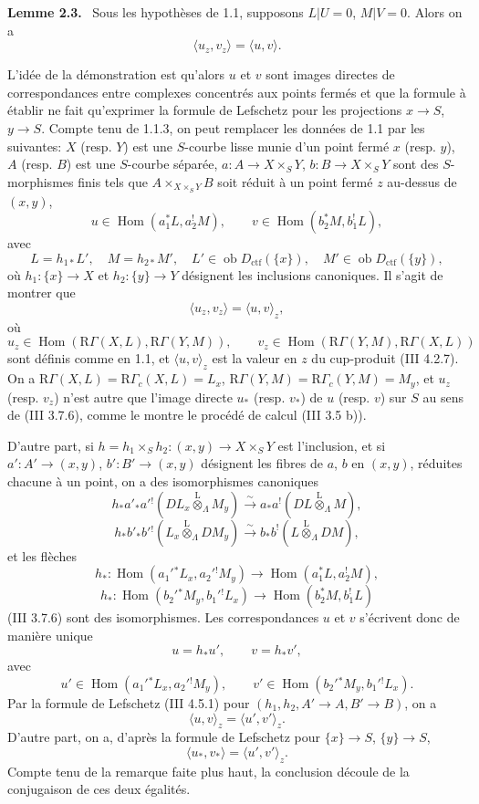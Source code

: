 \documentclass[11pt]{article}
\newenvironment{statement}[1]{\par\medskip\noindent\textbf{#1.}\ }{\par\medskip}
\DeclareMathOperator{\Hom}{Hom}
\providecommand{\lten}{\overset{\mathrm L}{\otimes}}
\providecommand{\Ob}{\operatorname{ob}}
\providecommand{\Hom}{\operatorname{Hom}}
\providecommand{\lten}{\overset{\mathrm L}{\otimes}}
\providecommand{\lten}{\overset{\mathrm L}{\otimes}}
\providecommand{\Ob}{\operatorname{ob}}
\providecommand{\lten}{\overset{\mathrm L}{\otimes}}
\providecommand{\lten}{\overset{\mathrm L}{\otimes}}
\providecommand{\Ob}{\operatorname{Ob}}
\providecommand{\lten}{\overset{\mathrm L}{\otimes}}
\providecommand{\Hom}{\operatorname{Hom}}
\providecommand{\Ob}{\operatorname{ob}}
\providecommand{\Ob}{\operatorname{Ob}}
\providecommand{\lten}{\overset{\mathrm L}{\otimes}}
\begin{document}
\begin{statement}{Lemme 2.3}
Sous les hypothèses de 1.1, supposons $L|U=0$, $M|V=0$. Alors on a
\[
\langle u_z,v_z\rangle=\langle u,v\rangle .
\]
\end{statement}

L'idée de la démonstration est qu'alors $u$ et $v$ sont images directes de correspondances entre complexes concentrés aux points fermés et que la formule à établir ne fait qu'exprimer la formule de Lefschetz pour les projections $x\to S$, $y\to S$. Compte tenu de 1.1.3, on peut remplacer les données de 1.1 par les suivantes: $X$ (resp. $Y$) est une $S$-courbe lisse munie d'un point fermé $x$ (resp. $y$), $A$ (resp. $B$) est une $S$-courbe séparée, $a:A\to X\times_S Y$, $b:B\to X\times_S Y$ sont des $S$-morphismes finis tels que $A\times_{X\times_SY}B$ soit réduit à un point fermé $z$ au-dessus de $(x,y)$,
\[
u\in\Hom(a_1^*L,a_2^!M),\qquad v\in\Hom(b_2^*M,b_1^!L),
\]
avec
\[
L=h_{1*}L',\quad M=h_{2*}M',\quad
L'\in\Ob D_{\mathrm{ctf}}(\{x\}),\quad M'\in\Ob D_{\mathrm{ctf}}(\{y\}),
\]
où $h_1:\{x\}\to X$ et $h_2:\{y\}\to Y$ désignent les inclusions canoniques. Il s'agit de montrer que
\[
\langle u_z,v_z\rangle=\langle u,v\rangle_z,
\]
où
\[
u_z\in\Hom(\mathrm R\Gamma(X,L),\mathrm R\Gamma(Y,M)),\qquad
v_z\in\Hom(\mathrm R\Gamma(Y,M),\mathrm R\Gamma(X,L))
\]
sont définis comme en 1.1, et $\langle u,v\rangle_z$ est la valeur en $z$ du cup-produit (III 4.2.7). On a $\mathrm R\Gamma(X,L)=\mathrm R\Gamma_c(X,L)=L_x$, $\mathrm R\Gamma(Y,M)=\mathrm R\Gamma_c(Y,M)=M_y$, et $u_z$ (resp. $v_z$) n'est autre que l'image directe $u_*$ (resp. $v_*$) de $u$ (resp. $v$) sur $S$ au sens de (III 3.7.6), comme le montre le procédé de calcul (III 3.5 b)).

D'autre part, si $h=h_1\times_Sh_2:(x,y)\to X\times_SY$ est l'inclusion, et si $a':A'\to(x,y)$, $b':B'\to(x,y)$ désignent les fibres de $a$, $b$ en $(x,y)$, réduites chacune à un point, on a des isomorphismes canoniques
\[
h_*a'_*a'{}^!(DL_x\lten_{\Lambda}M_y)
 \xrightarrow{\sim} a_*a^!(DL\lten_{\Lambda}M),
\]
\[
h_*b'_*b'{}^!(L_x\lten_{\Lambda}DM_y)
 \xrightarrow{\sim} b_*b^!(L\lten_{\Lambda}DM),
\]
et les flèches
\[
h_*:\Hom(a_1'{}^*L_x,a_2'{}^!M_y)\to \Hom(a_1^*L,a_2^!M),
\]
\[
h_*:\Hom(b_2'{}^*M_y,b_1'{}^!L_x)\to \Hom(b_2^*M,b_1^!L)
\]
(III 3.7.6) sont des isomorphismes. Les correspondances $u$ et $v$ s'écrivent donc de manière unique
\[
u=h_*u',\qquad v=h_*v',
\]
avec
\[
u'\in\Hom(a_1'{}^*L_x,a_2'{}^!M_y),\qquad
v'\in\Hom(b_2'{}^*M_y,b_1'{}^!L_x).
\]
Par la formule de Lefschetz (III 4.5.1) pour $(h_1,h_2,A'\to A,B'\to B)$, on a
\[
\langle u,v\rangle_z=\langle u',v'\rangle_z .
\]
D'autre part, on a, d'après la formule de Lefschetz pour $\{x\}\to S$, $\{y\}\to S$,
\[
\langle u_*,v_*\rangle=\langle u',v'\rangle_z .
\]
Compte tenu de la remarque faite plus haut, la conclusion découle de la conjugaison de ces deux égalités.
\end{document}
